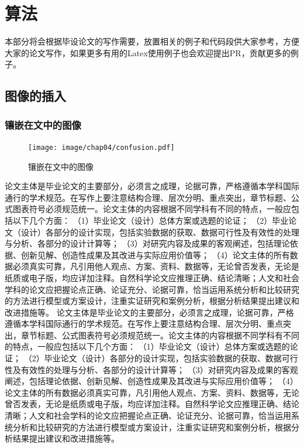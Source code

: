 \chapter{算法}
\label{cha:usage-example}

本部分将会根据毕设论文的写作需要，放置相关的例子和代码段供大家参考，方便大家的论文写作，如果更多有用的Latex使用例子也会欢迎提出PR，贡献更多的例子。

\section{图像的插入}

\subsection{镶嵌在文中的图像}
\begin{figure}
	\centering
	\texttt{[image: image/chap04/confusion.pdf]}
	\caption{镶嵌在文中的图像}
	\label{fig:image-embedding-text}
\end{figure}
论文主体是毕业论文的主要部分，必须言之成理，论据可靠，严格遵循本学科国际通行的学术规范。在写作上要注意结构合理、层次分明、重点突出，章节标题、公式图表符号必须规范统一。论文主体的内容根据不同学科有不同的特点，一般应包括以下几个方面： （1）毕业论文（设计）总体方案或选题的论证； （2）毕业论文（设计）各部分的设计实现，包括实验数据的获取、数据可行性及有效性的处理与分析、各部分的设计计算等； （3）对研究内容及成果的客观阐述，包括理论依据、创新见解、创造性成果及其改进与实际应用价值等； （4）论文主体的所有数据必须真实可靠，凡引用他人观点、方案、资料、数据等，无论曾否发表，无论是纸质或电子版，均应详加注释。自然科学论文应推理正确、结论清晰；人文和社会学科的论文应把握论点正确、论证充分、论据可靠，恰当运用系统分析和比较研究的方法进行模型或方案设计，注重实证研究和案例分析，根据分析结果提出建议和改进措施等。
论文主体是毕业论文的主要部分，必须言之成理，论据可靠，严格遵循本学科国际通行的学术规范。在写作上要注意结构合理、层次分明、重点突出，章节标题、公式图表符号必须规范统一。论文主体的内容根据不同学科有不同的特点，一般应包括以下几个方面： （1）毕业论文（设计）总体方案或选题的论证； （2）毕业论文（设计）各部分的设计实现，包括实验数据的获取、数据可行性及有效性的处理与分析、各部分的设计计算等； （3）对研究内容及成果的客观阐述，包括理论依据、创新见解、创造性成果及其改进与实际应用价值等； （4）论文主体的所有数据必须真实可靠，凡引用他人观点、方案、资料、数据等，无论曾否发表，无论是纸质或电子版，均应详加注释。自然科学论文应推理正确、结论清晰；人文和社会学科的论文应把握论点正确、论证充分、论据可靠，恰当运用系统分析和比较研究的方法进行模型或方案设计，注重实证研究和案例分析，根据分析结果提出建议和改进措施等。



